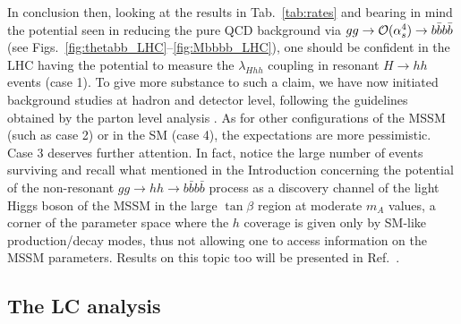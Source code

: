 In conclusion then, looking at the results in Tab.~\ref{tab:rates}
and bearing in mind the potential seen in reducing 
 the pure QCD background via $gg\to {\cal O}(\alpha_s^4)\to
b\bar b b\bar b$ (see
Figs.~\ref{fig:thetabb_LHC}--\ref{fig:Mbbbb_LHC}), one should be
confident in the LHC having the potential to measure the
$\lambda_{Hhh}$ coupling in resonant $H\to hh$ events (case 1). To
give more substance to such a claim, we have now initiated background
studies at hadron and detector level, following the guidelines
obtained by the parton level analysis \cite{more}.  As for other
configurations of the MSSM (such as case 2) or in the SM (case
4), the expectations are
more pessimistic. Case 3 deserves
further attention.  In fact, notice the large number of events
surviving and recall what mentioned in the Introduction concerning
 the potential of the non-resonant
$gg\to hh\to b\bar b b\bar b$ process as a discovery channel of the
light Higgs boson of the MSSM in the large $\tan\beta$ region at
moderate $m_A$ values, a corner of the parameter space where the $h$
coverage is given only by SM-like production/decay modes, thus not
allowing one to access information on the MSSM parameters. 
Results on this topic too will be presented in Ref.~\cite{more}.

\subsection{The LC analysis}
\label{subsec_LC}

